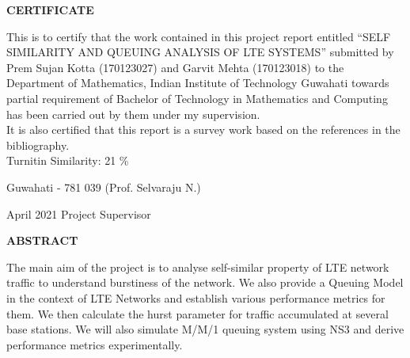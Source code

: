 \documentclass[12pt,a4paper]{report}
\theoremstyle{plain}
\theoremstyle{definition}
\theoremstyle{remark}
\begin{document}
 \setcounter{page}{2}
\begin{center}
{\Large{\bf{CERTIFICATE}}}
\end{center}


\noindent
This is to certify that the work contained in this project report entitled 
“SELF SIMILARITY AND QUEUING ANALYSIS OF LTE SYSTEMS” submitted by Prem Sujan Kotta (170123027) and Garvit Mehta (170123018) 
to the Department of Mathematics, Indian Institute of Technology Guwahati towards partial requirement of
Bachelor of Technology in Mathematics and Computing has been carried out by them under
my supervision. \\

\noindent
It is also certified that this report is a survey work based on the references
in the bibliography.\\

\noindent
Turnitin Similarity: 21 \%
%

\vspace{4cm}

\noindent Guwahati - 781 039 \hfill   (Prof. Selvaraju N.)

\noindent April 2021 \hfill Project Supervisor

\clearpage

\begin{center}
{\Large{\bf{ABSTRACT}}}
\end{center}


The main aim of the project is to analyse self-similar property of LTE network traffic to understand burstiness of the network. We also provide a Queuing Model in the context of LTE Networks and establish various performance metrics for them. We then calculate the hurst parameter for traffic accumulated at several base stations. We will also simulate M/M/1 queuing system using NS3 and derive performance metrics experimentally.



\clearpage



\tableofcontents
\clearpage
\listoffigures


\newpage

\setcounter{page}{1}














%



\nocite{fundamentals}\nocite{influ}\nocite{comp}\nocite{self}\nocite{CrovellaBestavros97}\nocite{282603}\nocite{10.1214/ss/1177010131}\nocite{beran1994statistics}



\end{document}
